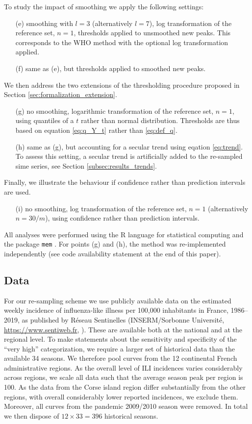 \documentclass[12pt]{article}
\begin{document}
\noindent To study the impact of smoothing we apply the following settings:
\begin{enumerate}
\item[(e)] smoothing with $l = 3$ (alternatively $l = 7$), log transformation of the reference set, $n = 1$, thresholds applied to unsmoothed new peaks. This corresponds to the WHO method with the optional log transformation applied.
\item[(f)] same as (e), but thresholds applied to smoothed new peaks.
\end{enumerate}
We then address the two extensions of the thresholding procedure proposed in Section \ref{sec:formalization_extension}.
\begin{enumerate}
\item[(g)] no smoothing, logarithmic transformation of the reference set, $n = 1$, using quantiles of a $t$ rather than normal distribution. Thresholds are thus based on equation \eqref{eq:q_Y_t} rather than \eqref{eq:def_q}.
\item[(h)] same as (g), but accounting for a secular trend using eqation \eqref{eq:trend}. To assess this setting, a secular trend is artificially added to the re-sampled sime series, see Section \ref{subsec:results_trends}.
\end{enumerate}
Finally, we illustrate the behaviour if confidence rather than prediction intervals are used.
\begin{enumerate}
\item[(i)] no smoothing, log transformation of the reference set, $n = 1$ (alternatively $n = 30/m$), using confidence rather than prediction intervals.
\end{enumerate}
All analyses were performed using the R language for statistical computing \citep{RCT2020} and the package \texttt{mem} \citep{Lozano2020}. For points (g) and (h), the method was re-implemented independently (see code availability statement at the end of this paper).

\subsection{Data}
\label{subsec:data}

For our re-sampling scheme we use publicly available data on the estimated weekly incidence of influenza-like illness per 100,000 inhabitants in France, 1986--2019, as published by Réseau Sentinelles (INSERM/Sorbonne Université, \url{https://www.sentiweb.fr}, \citealt{Flahault2006}). These are available both at the national and at the regional level. To make statements about the sensitivity and specificity of the ``very high'' categorization, we require a larger set of historical data than the available 34 seasons. We therefore pool curves from the 12 continental French administrative regions. As the overall level of ILI incidences varies considerably across regions, we scale all data such that the average season peak per region is 100. As the data from the Corse island region differ substantially from the other regions, with overall considerably lower reported incidences, we exclude them. Moreover, all curves from the pandemic 2009/2010 season were removed. In total we then dispose of $12 \times 33 = 396$ historical seasons.
\end{document}
